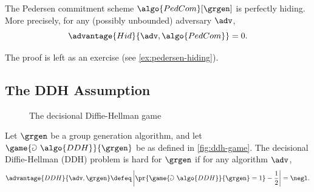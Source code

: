 \begin{theorem}\label{thm:pedersen-hiding}
  The Pedersen commitment scheme $\algo{PedCom}[\grgen]$ is perfectly hiding.
  More precisely, for any (possibly unbounded) adversary $\adv$,
  \[
  \advantage{Hid}{\adv, \algo{PedCom}} = 0.
  \]
\end{theorem}

The proof is left as an exercise (see \autoref{ex:pedersen-hiding}).

\subsection{The DDH Assumption}

\begin{figure}[tbhp]
  \begin{center}
    \begin{tcolorbox}[width=6cm]
      \begin{pchstack}[center]
      \end{pchstack}
    \end{tcolorbox}
  \end{center}
  \caption{The decisional Diffie-Hellman game\label{fig:ddh-game}}
\end{figure}

\begin{definition}
  Let $\grgen$ be a group generation algorithm, and let $\game{\Game~\algo{DDH}}{\grgen}$ be as defined in \autoref{fig:ddh-game}.
  The decisional Diffie-Hellman (DDH) problem is hard for $\grgen$ if for any \ppt algorithm $\adv$,
  \[
  \advantage{DDH}{\adv, \grgen} \defeq \left|\pr{\game{\Game~\algo{DDH}}{\grgen} = 1} - \frac{1}{2}\right| = \negl.
  \]
\end{definition}

